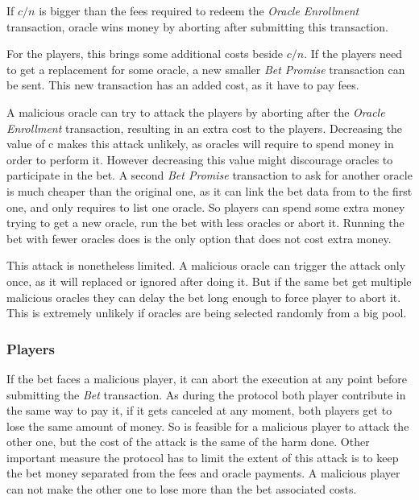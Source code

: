If $c/n$ is bigger than the fees required to redeem the
  \textit{Oracle Enrollment} transaction, oracle wins money by aborting after
  submitting this transaction.

For the players, this brings some additional costs beside $c/n$.
If the players need to get a replacement for some oracle, a new smaller
  \textit{Bet Promise} transaction can be sent.
This new transaction has an added cost, as it have to pay fees.

A malicious oracle can try to attack the players by aborting after the
  \textit{Oracle Enrollment} transaction, resulting in an extra cost to the
  players.
Decreasing the value of c makes this attack unlikely, as oracles will require
  to spend money in order to perform it.
However decreasing this value might discourage oracles to participate in the
  bet.
A second \textit{Bet Promise} transaction to ask for another oracle is much
  cheaper than the original one, as it can link the bet data from to the first
  one, and only requires to list one oracle.
So players can spend some extra money trying to get a new oracle, run the bet
  with less oracles or abort it.
Running the bet with fewer oracles does is the only option that does not cost
  extra money.

This attack is nonetheless limited.
A malicious oracle can trigger the attack only once, as it will replaced or
  ignored after doing it.
But if the same bet get multiple malicious oracles they can delay the bet long
  enough to force player to abort it.
This is extremely unlikely if oracles are being selected randomly from a big
  pool.

\subsubsection{Players} \label{subsec:individual_attack_player}
If the bet faces a malicious player, it can abort the execution at any point
  before submitting the \textit{Bet} transaction.
As during the protocol both player contribute in the same way to pay it, if it
  gets canceled at any moment, both players get to lose the same amount of
  money.
So is feasible for a malicious player to attack the other one, but the cost
  of the attack is the same of the harm done.
Other important measure the protocol has to limit the extent of this attack
  is to keep the bet money separated from the fees and oracle payments.
A malicious player can not make the other one to lose more than the bet
  associated costs.

